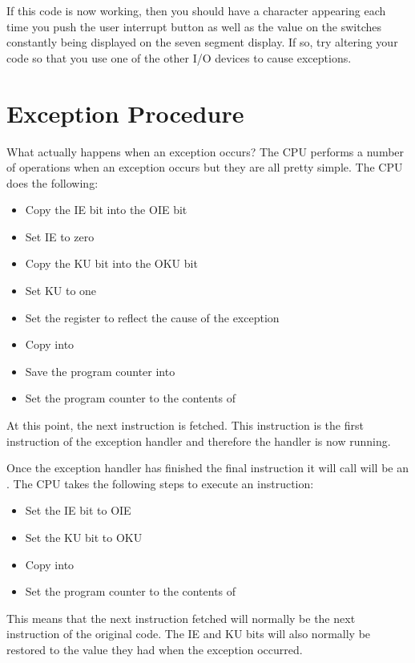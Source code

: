 If this code is now working, then you should have a character appearing
each time you push the user interrupt button as well as the value on the
switches constantly being displayed on the seven segment display. If so,
try altering your code so that you use one of the other I/O devices to
cause exceptions.

\section{Exception Procedure}

What actually happens when an exception occurs? The CPU performs a
number of operations when an exception occurs but they are all pretty
simple. The CPU does the following:

\begin{itemize}
\item Copy the IE bit into the OIE bit
\item Set IE to zero
\item Copy the KU bit into the OKU bit
\item Set KU to one
\item Set the  register to reflect the cause of the exception
\item Copy  into 
\item Save the program counter into 
\item Set the program counter to the contents of 
\end{itemize}

At this point, the next instruction is fetched. This instruction is the
first instruction of the exception handler and therefore the handler
is now running.

Once the exception handler has finished the final instruction it will
call will be an . The CPU takes the following steps to
execute an  instruction:

\begin{itemize}
\item Set the IE bit to OIE
\item Set the KU bit to OKU
\item Copy  into 
\item Set the program counter to the contents of 
\end{itemize}

This means that the next instruction fetched will normally be the
next instruction of the original code. The IE and KU bits will also
normally be restored to the value they had when the exception occurred.

